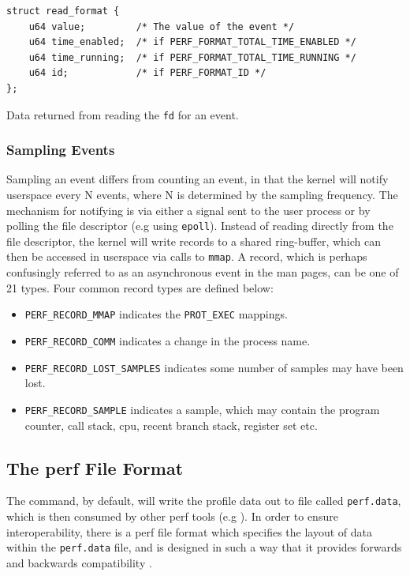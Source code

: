 \begin{listing}
    \begin{verbatim}
struct read_format {
    u64 value;         /* The value of the event */
    u64 time_enabled;  /* if PERF_FORMAT_TOTAL_TIME_ENABLED */
    u64 time_running;  /* if PERF_FORMAT_TOTAL_TIME_RUNNING */
    u64 id;            /* if PERF_FORMAT_ID */
};
    \end{verbatim}
    \caption{Data returned from reading the \texttt{fd} for an event.}
    \label{lst:struct_read_format}
\end{listing}

\subsubsection{Sampling Events}

Sampling an event differs from counting an event, in that the kernel will notify userspace every N events, where N is determined by the sampling frequency. The mechanism for notifying is via either a signal sent to the user process or by polling the file descriptor (e.g using \texttt{epoll}). Instead of reading directly from the file descriptor, the kernel will write records to a shared ring-buffer, which can then be accessed in userspace via calls to \texttt{mmap}. A record, which is perhaps confusingly referred to as an asynchronous event in the man pages, can be one of 21 types. Four common record types are defined below:

\ssp
\begin{itemize}
    \item \texttt{PERF\_RECORD\_MMAP} indicates the \texttt{PROT\_EXEC} mappings. 
    \item \texttt{PERF\_RECORD\_COMM} indicates a change in the process name.
    \item \texttt{PERF\_RECORD\_LOST\_SAMPLES} indicates some number of samples may have been lost.
    \item \texttt{PERF\_RECORD\_SAMPLE} indicates a sample, which may contain the program counter, call stack, cpu, recent branch stack, register set etc. 
\end{itemize}
\dsp

\subsection{The perf File Format}\label{sect:perf_file_format}

The  command, by default, will write the profile data out to file called \texttt{perf.data}, which is then consumed by other perf tools (e.g ). In order to ensure interoperability, there is a perf file format which specifies the layout of data within the \texttt{perf.data} file, and is designed in such a way that it provides forwards and backwards compatibility \cite{GithubPerfFileFormat}.

